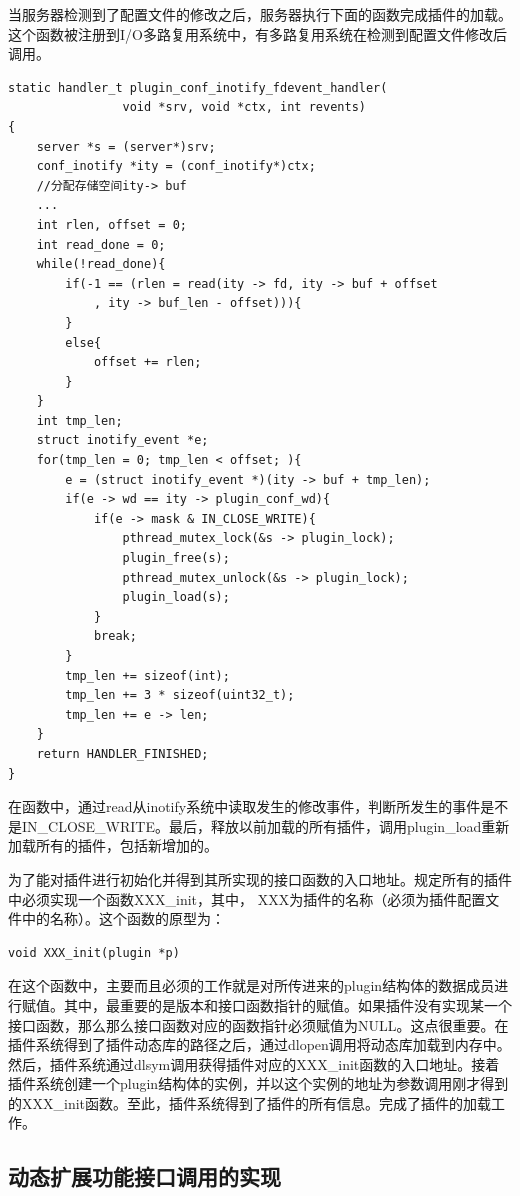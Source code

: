 \documentclass[twoside, xetex]{report}
\begin{document}
	当服务器检测到了配置文件的修改之后，服务器执行下面的函数完成插件的加载。这个函数被注册到I/O多路复用系统中，有多路复用系统在检测到配置文件修改后调用。
	
	\begin{lstlisting}
static handler_t plugin_conf_inotify_fdevent_handler(
				void *srv, void *ctx, int revents)
{
	server *s = (server*)srv;
	conf_inotify *ity = (conf_inotify*)ctx;
	//分配存储空间ity-> buf
	...
	int rlen, offset = 0;
	int read_done = 0;
	while(!read_done){
		if(-1 == (rlen = read(ity -> fd, ity -> buf + offset
			, ity -> buf_len - offset))){
		}
		else{
			offset += rlen;
		}
	}
	int tmp_len;
	struct inotify_event *e;
	for(tmp_len = 0; tmp_len < offset; ){
		e = (struct inotify_event *)(ity -> buf + tmp_len);
		if(e -> wd == ity -> plugin_conf_wd){
			if(e -> mask & IN_CLOSE_WRITE){
				pthread_mutex_lock(&s -> plugin_lock);
				plugin_free(s);
				pthread_mutex_unlock(&s -> plugin_lock);
				plugin_load(s);
			}
			break;
		}
		tmp_len += sizeof(int); 			
		tmp_len += 3 * sizeof(uint32_t);	
		tmp_len += e -> len;
	}
	return HANDLER_FINISHED;
}
	\end{lstlisting}
	
	在函数中，通过read从inotify系统中读取发生的修改事件，判断所发生的事件是不是IN\_CLOSE\_WRITE。最后，释放以前加载的所有插件，调用plugin\_load重新加载所有的插件，包括新增加的。
	
	为了能对插件进行初始化并得到其所实现的接口函数的入口地址。规定所有的插件中必须实现一个函数XXX\_init，其中，	XXX为插件的名称（必须为插件配置文件中的名称）。这个函数的原型为：
	
\begin{lstlisting}
void XXX_init(plugin *p)
\end{lstlisting}

	在这个函数中，主要而且必须的工作就是对所传进来的plugin结构体的数据成员进行赋值。其中，最重要的是版本和接口函数指针的赋值。如果插件没有实现某一个接口函数，那么那么接口函数对应的函数指针必须赋值为NULL。这点很重要。在插件系统得到了插件动态库的路径之后，通过dlopen调用将动态库加载到内存中。然后，插件系统通过dlsym调用获得插件对应的XXX\_init函数的入口地址。接着插件系统创建一个plugin结构体的实例，并以这个实例的地址为参数调用刚才得到的XXX\_init函数。至此，插件系统得到了插件的所有信息。完成了插件的加载工作。
	
\subsection{动态扩展功能接口调用的实现}
\end{document}

